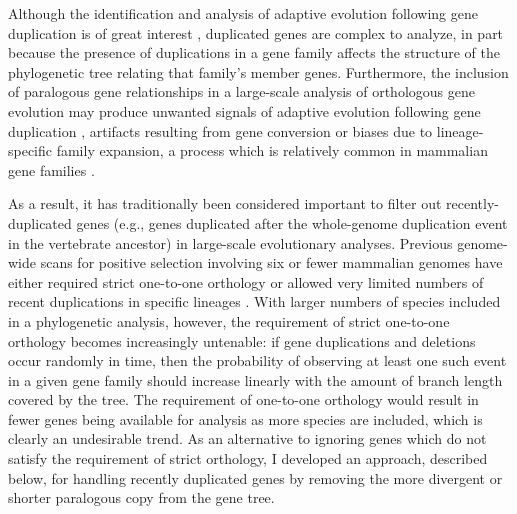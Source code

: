 
Although the identification and analysis of adaptive evolution
following gene duplication is of great interest
\citep{Lynch2000,Zhang2002,He2005,Hahn2009a}, duplicated genes are
complex to analyze, in part because the presence of duplications in a
gene family affects the structure of the phylogenetic tree relating
that family's member genes. Furthermore, the inclusion of paralogous
gene relationships in a large-scale analysis of orthologous gene
evolution may produce unwanted signals of adaptive evolution following
gene duplication \citep{Lynch2000}, artifacts resulting from gene
conversion \citep{Casola2009} or biases due to lineage-specific family
expansion, a process which is relatively common in mammalian gene
families \citep{Gu2002}.


As a result, it has traditionally been considered important to filter
out recently-duplicated genes (e.g., genes duplicated after the
whole-genome duplication event in the vertebrate ancestor) in
large-scale evolutionary analyses. Previous genome-wide scans for
positive selection involving six or fewer mammalian genomes have
either required strict one-to-one orthology
\citep{Clark2003,Nielsen2005} or allowed very limited numbers of
recent duplications in specific lineages \citep{Kosiol2008}. With
larger numbers of species included in a phylogenetic analysis,
however, the requirement of strict one-to-one orthology becomes
increasingly untenable: if gene duplications and deletions occur
randomly in time, then the probability of observing at least one such
event in a given gene family should increase linearly with the amount
of branch length covered by the tree. The requirement of one-to-one
orthology would result in fewer genes being available for analysis as
more species are included, which is clearly an undesirable trend. As
an alternative to ignoring genes which do not satisfy the requirement
of strict orthology, I developed an approach, described below, for
handling recently duplicated genes by removing the more divergent or
shorter paralogous copy from the gene tree.

